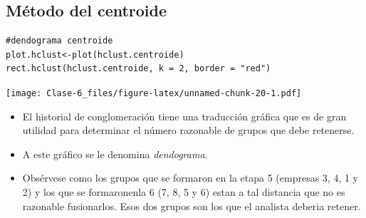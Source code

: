 \documentclass[]{article}
\providecommand{\tightlist}{%
  \setlength{\itemsep}{0pt}\setlength{\parskip}{0pt}}
\begin{document}
\subsection{Método del centroide}\label{muxe9todo-del-centroide-4}

\hypertarget{left}{}
\begin{verbatim}
#dendograma centroide
plot.hclust<-plot(hclust.centroide)
rect.hclust(hclust.centroide, k = 2, border = "red")
\end{verbatim}

\texttt{[image: Clase-6\_files/figure-latex/unnamed-chunk-20-1.pdf]}

\hypertarget{right}{}
\begin{itemize}
\tightlist
\item
  El historial de conglomeración tiene una traducción gráfica que es de
  gran utilidad para determinar el número razonable de grupos que debe
  retenerse.
\item
  A este gráfico se le denomina \emph{dendograma}.
\item
  Obsérvese como los grupos que se formaron en la etapa 5 (empresas 3,
  4, 1 y 2) y los que se formaronenla 6 (7, 8, 5 y 6) estan a tal
  distancia que no es razonable fusionarlos. Esos dos grupos son los que
  el analista deberia retener.
\end{itemize}
\end{document}
